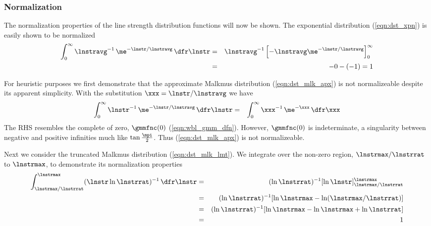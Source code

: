 \documentclass[12pt]{article}
\begin{document}
\subsubsection[Normalization]{Normalization}\label{sxn:lnstr_dst_nrm}
The normalization properties of the line strength distribution
functions will now be shown.
The exponential distribution (\ref{eqn:dst_xpn}) is easily shown to be  
normalized 
\begin{eqnarray}
\int_{0}^{\infty} \lnstravg^{-1} \, \me^{-\lnstr/\lnstravg} \,
\dfr\lnstr 
& = &
\lnstravg^{-1} \left[ -\lnstravg \me^{-\lnstr/\lnstravg} \right]_{0}^{\infty} \nonumber \\
& = &
- 0 - (-1) = 1
\label{eqn:xpn_nrm}
\end{eqnarray}

For heuristic purposes we first demonstrate that the approximate
Malkmus distribution (\ref{eqn:dst_mlk_apx}) is not normalizeable
despite its apparent simplicity.
With the substitution $\xxx = \lnstr/\lnstravg$ we have
\begin{eqnarray}
\int_{0}^{\infty} \lnstr^{-1} \, \me^{-\lnstr/\lnstravg} \,
\dfr\lnstr 
& = &
\int_{0}^{\infty} \xxx^{-1} \, \me^{-\xxx} \,\dfr\xxx 
\label{eqn:mlk_apx_nrm}
\end{eqnarray}
The RHS resembles the complete  of zero,
$\gmmfnc(0)$ (\ref{eqn:wbl_gmm_dfn}).  
However, $\gmmfnc(0)$ is indeterminate, a singularity between negative
and positive infinities much like $\tan \frac{\mpi}{2}$.
Thus (\ref{eqn:dst_mlk_apx}) is not normalizeable.

Next we consider the truncated Malkmus distribution
(\ref{eqn:dst_mlk_lmt}).
We integrate over the non-zero region, $\lnstrmax/\lnstrrat$ to  
$\lnstrmax$, to demonstrate its normalization properties
\begin{eqnarray}
\int_{\lnstrmax/\lnstrrat}^{\lnstrmax} 
(\lnstr \ln \lnstrrat)^{-1} \,\dfr\lnstr
& = &
(\ln \lnstrrat)^{-1} 
[ \ln \lnstr]_{\lnstrmax/\lnstrrat}^{\lnstrmax} \nonumber \\
& = &
(\ln \lnstrrat)^{-1} 
[ \ln \lnstrmax - \ln (\lnstrmax/\lnstrrat) ] \nonumber \\
& = &
(\ln \lnstrrat)^{-1} 
[ \ln \lnstrmax - \ln \lnstrmax + \ln \lnstrrat ] \nonumber \\
& = & 1
\label{eqn:mlk_lmt_nrm}
\end{eqnarray}
\end{document}
